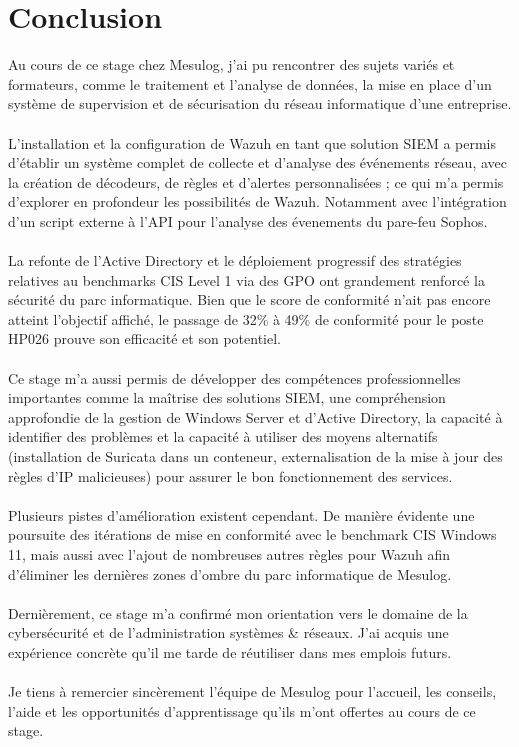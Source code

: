 \documentclass[a4paper, 11pt]{article}
\begin{document}
\section{Conclusion}

Au cours de ce stage chez Mesulog, j'ai pu rencontrer des sujets variés et formateurs, comme le traitement et l'analyse de données, la mise en place d'un système de supervision et de sécurisation du réseau informatique d'une entreprise.\\
\\
L'installation et la configuration de Wazuh en tant que solution SIEM a permis d'établir un système complet de collecte et d'analyse des événements réseau, avec la création de décodeurs, de règles et d'alertes personnalisées ; ce qui m'a permis d'explorer en profondeur les possibilités de Wazuh. Notamment avec l'intégration d'un script externe à l'API pour l'analyse des évenements du pare-feu Sophos.\\
\\
La refonte de l'Active Directory et le déploiement progressif des stratégies relatives au benchmarks CIS Level 1 via des GPO ont grandement renforcé la sécurité du parc informatique. Bien que le score de conformité n'ait pas encore atteint l'objectif affiché, le passage de 32\% à 49\% de conformité pour le poste HP026 prouve son efficacité et son potentiel.\\
\\
Ce stage m'a aussi permis de développer des compétences professionnelles importantes comme la maîtrise des solutions SIEM, une compréhension approfondie de la gestion de Windows Server et d'Active Directory, la capacité à identifier des problèmes et la capacité à utiliser des moyens alternatifs (installation de Suricata dans un conteneur, externalisation de la mise à jour des règles d'IP malicieuses) pour assurer le bon fonctionnement des services.\\
\\
Plusieurs pistes d'amélioration existent cependant. De manière évidente une poursuite des itérations de mise en conformité avec le benchmark CIS Windows 11, mais aussi avec l'ajout de nombreuses autres règles pour Wazuh afin d'éliminer les dernières zones d'ombre du parc informatique de Mesulog.\\
\\
Dernièrement, ce stage m'a confirmé mon orientation vers le domaine de la cybersécurité et de l'administration systèmes \& réseaux. J'ai acquis une expérience concrète qu'il me tarde de réutiliser dans mes emplois futurs.\\
\\
Je tiens à remercier sincèrement l'équipe de Mesulog pour l'accueil, les conseils, l'aide et les opportunités d'apprentissage qu'ils m'ont offertes au cours de ce stage.
\end{document}
